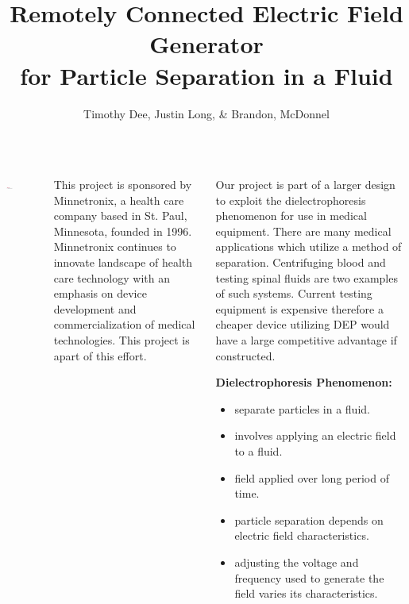 \documentclass[25pt, a0paper, portrait, margin=0mm, innermargin=15mm, blockverticalspace=15mm, colspace=15mm, subcolspace=8mm]{tikzposter}
\author{Timothy Dee, Justin Long, \& Brandon, McDonnel}
\title{Remotely Connected Electric Field Generator \\
for Particle Separation in a Fluid}
\institute{Team May1612}
\begin{document}
\maketitle

\begin{columns}

{
\begin{tikzfigure}
\includegraphics[width=0.2\textwidth]{images/minnetronix_logo.png}
\end{tikzfigure} 

This project is sponsored by
Minnetronix, a health care company based in St. Paul, Minnesota,
founded in 1996.
Minnetronix continues to innovate landscape of health care technology
with an emphasis on device development and commercialization of medical technologies.
This project is apart of this effort.
}

%
%
{
\begin{multicols}{2}

Our project is part of a larger design to 
exploit the dielectrophoresis phenomenon for
use in medical equipment.
There are many medical applications which
utilize a method of separation.
Centrifuging blood and
testing spinal fluids are two examples of 
such systems.
Current testing equipment is expensive therefore
a cheaper device utilizing DEP would have 
a large competitive advantage if constructed. 

\textbf{Dielectrophoresis Phenomenon:}
\begin{itemize}
\item separate particles in a fluid.
\item involves applying an electric field to a fluid.
\item field applied over long period of time.
\item particle separation depends on electric field characteristics.
\item adjusting the voltage and frequency used to generate the field 
varies its characteristics.
\end{itemize}

\end{multicols}


}
\end{columns}
\end{document}
